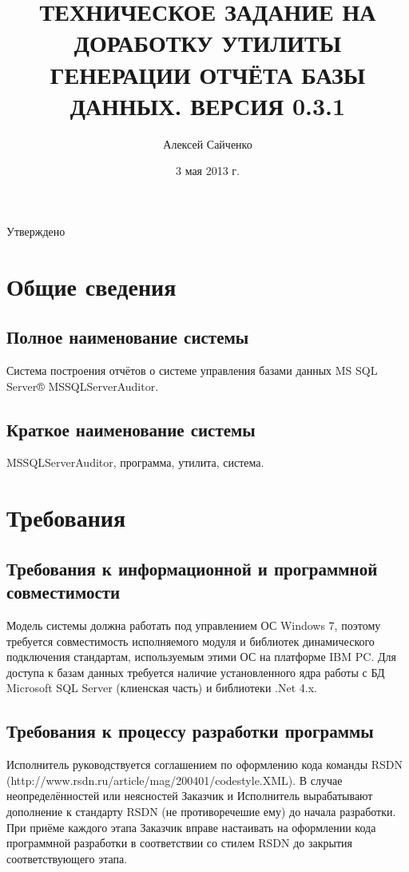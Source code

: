 \documentclass[10pt,a4paper]{article}
\title{ТЕХНИЧЕСКОЕ ЗАДАНИЕ НА ДОРАБОТКУ УТИЛИТЫ ГЕНЕРАЦИИ ОТЧЁТА БАЗЫ ДАННЫХ. ВЕРСИЯ 0.3.1}
\date{3 мая 2013 г.}
\author{Алексей Сайченко}
\begin{document}
\maketitle
\tableofcontents

Утверждено

\section{Общие сведения}

\subsection{Полное наименование системы}

Система построения отчётов о системе управления базами данных MS SQL Server® MSSQLServerAuditor.

\subsection{Краткое наименование системы}

MSSQLServerAuditor, программа, утилита, система.

\section{Требования}

\subsection{Требования к информационной и программной совместимости}

Модель системы должна работать под управлением ОС Windows 7, поэтому требуется
совместимость исполняемого модуля и библиотек динамического подключения
стандартам, используемым этими ОС на платформе IBM PC. Для доступа к базам
данных требуется наличие установленного ядра работы с БД Microsoft SQL Server
(клиенская часть) и библиотеки .Net 4.x.

\subsection{Требования к процессу разработки программы}

Исполнитель руководствуется соглашением по оформлению кода команды RSDN
(http://www.rsdn.ru/article/mag/200401/codestyle.XML). В случае
неопределённостей или неясностей Заказчик и Исполнитель вырабатывают дополнение
к стандарту RSDN (не противоречешие ему) до начала разработки. При приёме
каждого этапа Заказчик вправе настаивать на оформлении кода программной
разработки в соответствии со стилем RSDN до закрытия соответствующего этапа.
\end{document}
